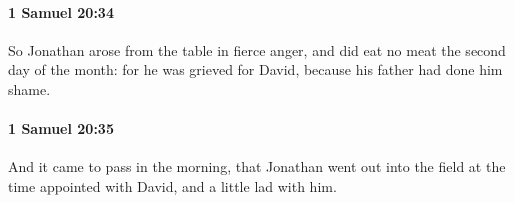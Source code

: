 		\paragraph{1 Samuel 20:34} %
			\label{1SAMUEL-20-34}

			So Jonathan arose from the table in fierce anger, and did eat no meat the second day of the month: for he was grieved for David, because his father had done him shame.


		\paragraph{1 Samuel 20:35} %
			\label{1SAMUEL-20-35}

			And it came to pass in the morning, that Jonathan went out into the field at the time appointed with David, and a little lad with him.



